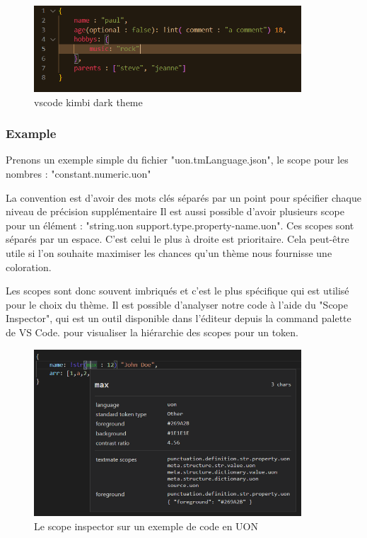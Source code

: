\documentclass[
    iict, %
    il, %
]{heig-tb}
\begin{document}
\begin{figure}[!h]
    \begin{center}
        \includegraphics[width=10cm]{assets/figures/vscode-kimbi-dark-theme.PNG}
    \end{center}
    \caption[Thème vscode kimbi dark]{\label{vscode-kimbi-dark-theme} vscode kimbi dark theme}
\end{figure}

\subsubsection{Example}
Prenons un exemple simple du fichier "uon.tmLanguage.json", le scope pour les nombres : "constant.numeric.uon"

La convention est d'avoir des mots clés séparés par un point pour spécifier chaque niveau de précision supplémentaire
Il est aussi possible d'avoir plusieurs scope pour un élément : "string.uon support.type.property-name.uon". Ces scopes sont séparés par un espace.
C'est celui le plus à droite est prioritaire. Cela peut-être utile si l'on souhaite maximiser les chances qu'un thème nous fournisse une coloration.
\cite{scopes-selectors}

Les scopes sont donc souvent imbriqués et c'est le plus spécifique qui est utilisé pour le choix du thème.
Il est possible d'analyser notre code à l'aide du "Scope Inspector", qui est un outil disponible dans l'éditeur depuis la command palette de VS Code.
pour visualiser la hiérarchie des scopes pour un token.

\begin{figure}[!h]
    \begin{center}
        \includegraphics[width=10cm]{assets/figures/scope-inspector.png}
    \end{center}
    \caption[Scope inspector]{\label{basic-uon} Le scope inspector sur un exemple de code en UON}
\end{figure}
\end{document}
